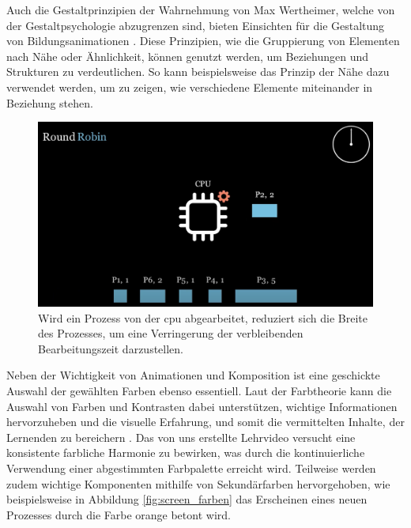 Auch die Gestaltprinzipien der Wahrnehmung von Max Wertheimer, welche von der Gestaltpsychologie abzugrenzen sind, bieten Einsichten für die Gestaltung von Bildungsanimationen \autocite{wertheimer_untersuchungen_2017}. Diese Prinzipien, wie die Gruppierung von Elementen nach Nähe oder Ähnlichkeit, können genutzt werden, um Beziehungen und Strukturen zu verdeutlichen. So kann beispielsweise das Prinzip der Nähe dazu verwendet werden, um zu zeigen, wie verschiedene Elemente miteinander in Beziehung stehen. 

\begin{figure}[h]
	\centering
	\includegraphics[width=0.8\linewidth]{img/screen_komposition.png} 
	\caption{Wird ein Prozess von der \ac{cpu} abgearbeitet, reduziert sich die Breite des Prozesses, um eine Verringerung der verbleibenden Bearbeitungszeit darzustellen.}
	\label{fig:screen_komposition} 
\end{figure}


Neben der Wichtigkeit von Animationen und Komposition ist eine geschickte Auswahl der gewählten Farben ebenso essentiell. Laut der Farbtheorie kann die Auswahl von Farben und Kontrasten dabei unterstützen, wichtige Informationen hervorzuheben und die visuelle Erfahrung, und somit die vermittelten Inhalte, der Lernenden zu bereichern \autocite{ballard_art_1964}. Das von uns erstellte Lehrvideo versucht eine konsistente farbliche Harmonie zu bewirken, was durch die kontinuierliche Verwendung einer abgestimmten Farbpalette erreicht wird. Teilweise werden zudem wichtige Komponenten mithilfe von Sekundärfarben hervorgehoben, wie beispielsweise in Abbildung \ref{fig:screen_farben} das Erscheinen eines neuen Prozesses durch die Farbe orange betont wird. 

